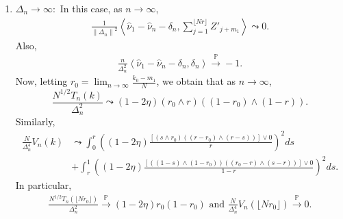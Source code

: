 \documentclass[11pt]{article}
\newcommand{\bP}{\mathbb{P}}
\theoremstyle{plain}
\theoremstyle{definition}
\theoremstyle{remark}
\begin{document}
\begin{appendix}
\begin{enumerate}
\begin{align*}
        \end{align*}
        \begin{align*}
            &N V_n(k)\\
            &\leadsto \frac{1}{\eta^2(1-2\eta)}\Bigg(\int_{0}^{r}\left\langle \tilde{W}(\eta)-\tilde{W}(1)+\tilde{W}(1-\eta),\tilde{W}(s(1-2\eta)+\eta)-\tilde{W}(\eta)\right\rangle^2ds\\
            &+\int_{r}^{1}\langle \tilde{W}(\eta)-\tilde{W}(1)+\tilde{W}(1-\eta),\tilde{W}(1-\eta)-\tilde{W}(s(1-2\eta)+\eta)\\
            &-\frac{1-s}{1-r}(\tilde{W}(1-\eta)-\tilde{W}(r(1-2\eta)+\eta))\rangle^2ds\Bigg).
        \end{align*}
        Now, observe that the above two limiting processes are same as the ones we derived under the null. Therefore, following the same lines of argument, we can establish that as $n \to \infty$, $G_n \overset{D}{\to}G.$
        Therefore, $\bP(G_n>G_{1-\alpha})\to \alpha.$
        \item $\Delta_n\to \infty:$ In this case, as $n \to \infty$,
        \begin{align*}
            \frac{1}{\left\|\Delta_n\right\|^2} \left\langle\hat{\nu}_1-\hat{\nu}_n-\delta_n, \sum_{j=1}^{\lfloor Nr \rfloor} Z'_{j+m_1}\right\rangle\leadsto 0.
        \end{align*}
        Also,
        \begin{align*}
            \frac{n}{\Delta_n^2}\left\langle\hat{\nu}_1-\hat{\nu}_n-\delta_n, \delta_n\right\rangle\overset{\bP}{\to}-1.
        \end{align*}
        Now, letting $r_0=\lim_{n \to \infty}\frac{k_0-m_1}{N}$, we obtain that as $n\to \infty$,
        $$\frac{N^{1/2}T_n(k)}{\Delta_n^2}\leadsto (1-2\eta)(r_0\wedge r)((1-r_0)\wedge (1-r)).$$
    Similarly,
    \begin{align*}
        \frac{N}{\Delta_n^4}V_n(k)&\leadsto \int_{0}^{r}\left((1-2\eta)\frac{[(s \wedge r_0)((r-r_0)\wedge (r-s))]\vee 0}{r}\right)^2 ds\\
        &+\int_{r}^{1} \left((1-2\eta)\frac{[((1-s) \wedge (1-r_0))((r_0-r)\wedge (s-r))]\vee 0}{1-r}\right)^2 ds.
    \end{align*}
    In particular, 
    \begin{align*}
        \frac{N^{1/2}T_n(\lfloor N r_0 \rfloor)}{\Delta_n^2}\overset{\bP}{\to} (1-2\eta)r_0(1-r_0)\text{ and } \frac{N}{\Delta_n^4}V_n(\lfloor N r_0 \rfloor)\overset{\bP}{\to} 0.
    \end{align*}

\end{enumerate}
\end{appendix}
\end{document}
